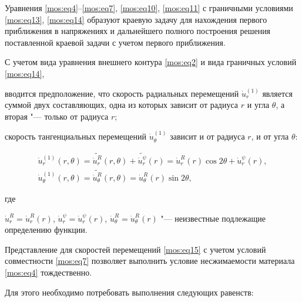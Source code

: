 Уравнения \eqref{mos:eq4}--\eqref{mos:eq7}, \eqref{mos:eq10}, \eqref{mos:eq11}  с граничными условиями \eqref{mos:eq13}, \eqref{mos:eq14} образуют краевую задачу для нахождения первого приближения в напряжениях и дальнейшего полного построения решения поставленной краевой задачи с учетом первого приближения.



\smallskip




С учетом  вида уравнения внешнего контура \eqref{mos:eq2} и вида граничных условий \eqref{mos:eq14}, 

вводится предположение, что скорость радиальных перемещений  $\displaystyle\dot{u}_{r}^{(1)}$ является суммой двух составляющих, одна из которых зависит от радиуса $r$ и угла $\theta$, а вторая "--- только от радиуса $r$; 

скорость тангенциальных перемещений $\displaystyle\dot{u}_{\theta}^{(1)}$ зависит и от радиуса $r$, и от угла $\theta$:

\begin{equation}

\label{mos:eq15}

\begin{array}{l}\displaystyle

\dot{u}_{r}^{(1)}(r,\theta)=\widetilde{\dot{u}^{R}_r}(r,\theta)+\widetilde{\dot{u}^{\psi}_r}(r)=\dot{u}^{R}_r(r) \cos{2 \theta} + \dot{u}^{\psi}_r(r),

\\[2mm] \displaystyle

\dot{u}_{\theta}^{(1)}(r,\theta)=\widetilde{\dot{u}_{\theta}^{R}}(r,\theta)=\dot{u}^{R}_{\theta}(r)\sin{2 \theta},

\end{array}

\end{equation}

где

$\dot{u}^{R}_r=\dot{u}^{R}_r(r)$, $\dot{u}^{\psi}_r=\dot{u}^{\psi}_r(r)$, $\dot{u}^{R}_{\theta}=\dot{u}^{R}_{\theta}(r)$ "--- неизвестные подлежащие определению функции.



Представление для скоростей перемещений \eqref{mos:eq15} с учетом условий совместности \eqref{mos:eq7} позволяет выполнить условие несжимаемости материала \eqref{mos:eq4}  тождественно. 

Для этого необходимо потребовать выполнения следующих равенств:


